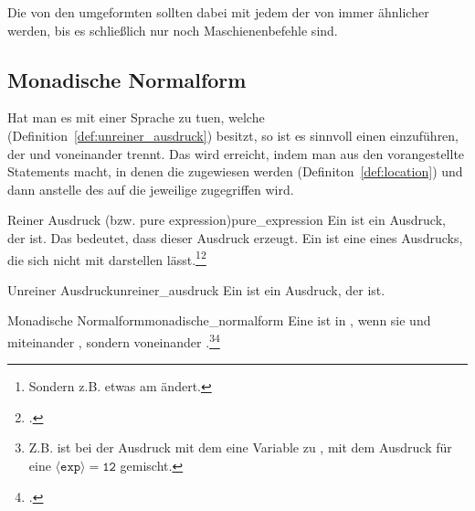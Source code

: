 Die von den  umgeformten  sollten dabei mit jedem  der  von  immer ähnlicher werden, bis es schließlich nur noch Maschienenbefehle sind.


\subsection{Monadische Normalform}

Hat man es mit einer Sprache zu tuen, welche  (Definition~\ref{def:unreiner_ausdruck}) besitzt, so ist es sinnvoll einen  einzuführen, der  und  voneinander trennt. Das wird erreicht, indem man aus den  vorangestellte Statements macht, in denen die   zugewiesen werden (Definiton~\ref{def:location}) und dann anstelle des  auf die jeweilige  zugegriffen wird.


\begin{Definition}{Reiner Ausdruck (bzw. pure expression)}{pure_expression}
  Ein  ist ein Ausdruck, der  ist. Das bedeutet, dass dieser Ausdruck  erzeugt. Ein  ist eine  eines Ausdrucks, die sich nicht mit  darstellen lässt.\footnote{Sondern z.B.  etwas am  ändert.}\footcite{g_siek_course_2022}
\end{Definition}

\begin{Definition}{Unreiner Ausdruck}{unreiner_ausdruck}
  Ein  ist ein Ausdruck, der  ist.
\end{Definition}

\begin{Definition}{Monadische Normalform}{monadische_normalform}
  Eine  ist in , wenn sie  und   miteinander , sondern voneinander .\footnote{Z.B. ist bei  der Ausdruck mit dem  eine Variable zu  , mit dem Ausdruck für eine  $\mathtt{\langle exp\rangle = 12}$ gemischt.}\footcite{g_siek_course_2022}
\end{Definition}

